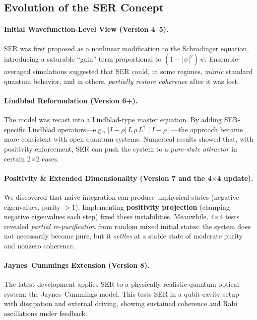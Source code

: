 \documentclass[12pt]{article}
\begin{document}
\subsection{Evolution of the SER Concept}

\paragraph{Initial Wavefunction-Level View (Version 4--5).}
SER was first proposed as a nonlinear modification to the Schr\"odinger equation, introducing a saturable ``gain'' term proportional to $(1 - |\psi|^2)\,\psi$. Ensemble-averaged simulations suggested that SER could, in some regimes, \emph{mimic} standard quantum behavior, and in others, \emph{partially restore coherence} after it was lost.

\paragraph{Lindblad Reformulation (Version 6+).}
The model was recast into a Lindblad-type master equation. By adding SER-specific Lindblad operators---e.g., $\bigl[I - \rho\bigr]\,L\,\rho\,L^\dagger\,[I - \rho]$---the approach became more consistent with open quantum systems. Numerical results showed that, with positivity enforcement, SER can push the system to a \emph{pure-state attractor} in certain 2$\times$2 cases.

\paragraph{Positivity \& Extended Dimensionality (Version 7 and the 4$\times$4 update).}
We discovered that naive integration can produce unphysical states (negative eigenvalues, purity $> 1$). Implementing \textbf{positivity projection} (clamping negative eigenvalues each step) fixed these instabilities. Meanwhile, 4$\times$4 tests revealed \emph{partial re-purification} from random mixed initial states: the system does not necessarily become pure, but it \emph{settles} at a stable state of moderate purity and nonzero coherence.

\paragraph{Jaynes--Cummings Extension (Version 8).}
The latest development applies SER to a physically realistic quantum-optical system: the Jaynes--Cummings model. This tests SER in a qubit-cavity setup with dissipation and external driving, showing sustained coherence and Rabi oscillations under feedback.
\end{document}
